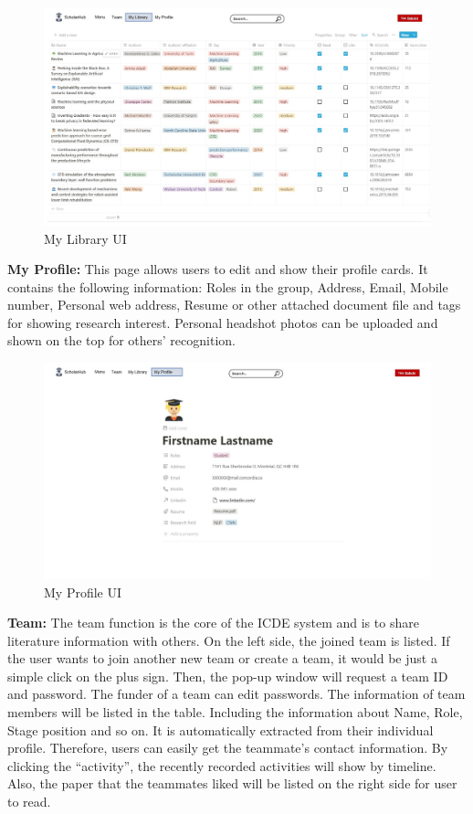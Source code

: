 \begin{figure}[htp]
	\centering
	\includegraphics[width=\textwidth]{./img/UI My Library.jpg}
	\caption{My Library UI}
	\label{My Library UI}
\end{figure}

\textbf {My Profile:} This page allows users to edit and show their profile cards. It contains the following information: Roles in the group, Address, Email, Mobile number, Personal web address, Resume or other attached document file and tags for showing research interest. Personal headshot photos can be uploaded and shown on the top for others’ recognition.

\begin{figure}[htp]
	\centering
	\includegraphics[width=\textwidth]{./img/UI my profile.jpg}
	\caption{My Profile UI}
	\label{my profile UI}
\end{figure}

\textbf {Team:} The team function is the core of the ICDE system and is to share literature information with others. On the left side, the joined team is listed. If the user wants to join another new team or create a team, it would be just a simple click on the plus sign. Then, the pop-up window will request a team ID and password. The funder of a team can edit passwords. The information of team members will be listed in the table. Including the information about Name, Role, Stage position and so on. It is automatically extracted from their individual profile. Therefore, users can easily get the teammate’s contact information. By clicking the “activity”, the recently recorded activities will show by timeline. Also, the paper that the teammates liked will be listed on the right side for user to read.

